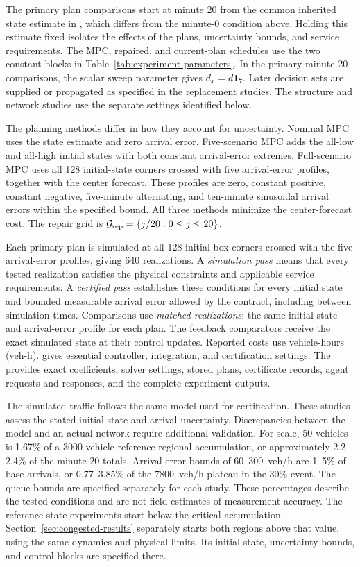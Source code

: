 The primary plan comparisons start at minute 20 from the common inherited
state estimate in , which differs from
the minute-0 condition above. Holding this estimate fixed isolates the
effects of the plans, uncertainty bounds, and service requirements.
The MPC, repaired, and current-plan schedules use the two constant
blocks in Table~\ref{tab:experiment-parameters}. In the primary minute-20
comparisons, the scalar sweep parameter gives $d_x=d\mathbf1_7$.
Later decision sets are supplied or propagated as specified in the
replacement studies. The structure and network studies use the
separate settings identified below.

The planning methods differ in how they account for uncertainty.
Nominal MPC uses the state estimate and zero arrival error.
Five-scenario MPC adds the all-low and all-high initial states with both
constant arrival-error extremes. Full-scenario MPC uses all 128 initial-state
corners crossed with five arrival-error profiles, together with the center
forecast. These profiles are zero, constant positive, constant negative,
five-minute alternating, and ten-minute sinusoidal arrival errors within the
specified bound. All three methods minimize the center-forecast cost.
The repair grid is
$\mathcal G_{\rm rep}=\{j/20:0\le j\le20\}$.

Each primary plan is simulated at all 128 initial-box corners crossed
with the five arrival-error profiles, giving 640 realizations. A
\emph{simulation pass} means that every tested realization satisfies the
physical constraints and applicable service requirements. A
\emph{certified pass} establishes these conditions for every initial state
and bounded measurable arrival error allowed by the contract, including
between simulation times. Comparisons use \emph{matched realizations}:
the same initial state and arrival-error profile for each plan.
The feedback comparators receive the exact simulated state at their
control updates.
Reported costs use vehicle-hours (veh-h).
 gives essential controller, integration,
and certification settings. The 
provides exact coefficients, solver settings, stored plans, certificate
records, agent requests and responses, and the complete experiment outputs.

The simulated traffic follows the same model used for certification.
These studies assess the stated initial-state and arrival uncertainty.
Discrepancies between the model and an actual network require additional
validation. For scale, 50 vehicles is 1.67\% of a 3000-vehicle reference
regional accumulation, or approximately 2.2--2.4\% of the minute-20 totals.
Arrival-error bounds of 60--300~veh/h are 1--5\% of base arrivals, or
0.77--3.85\% of the 7800~veh/h plateau in the 30\% event. The queue bounds
are specified separately for each study. These percentages describe the
tested conditions and are not field estimates of measurement accuracy.
The reference-state experiments start below the critical accumulation.
Section~\ref{sec:congested-results} separately starts both regions above
that value, using the same dynamics and physical limits. Its initial
state, uncertainty bounds, and control blocks are specified there.


